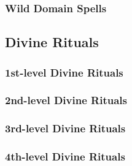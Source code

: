 \subsubsection{Wild Domain Spells}

\begin{spelllist}
    \SLentangle[1]
    \SLrockblast[2]
    \SLearthspull[3]
    \SLsunbeam[4]
    \SLavatarofgrowth[5]
    \SLlifegivingroots[6]
    \SLsunburst[7]
    \SLfirestorm[8]
    \SLearthquake[9]
\end{spelllist}

\subsection{Divine Rituals}\label{Divine Rituals}
\subsubsection{1st-level Divine Rituals}
\begin{rituallist}
    \SLblesswater
    \SLcreatewater
    \SLendureelements
    \SLidentify
    \SLlight
    \SLmending
    \SLpurifysustenance
    \SLreadmagic
\end{rituallist}

\subsubsection{2nd-level Divine Rituals}
\begin{rituallist}
    \SLaugury
    \SLcomprehendlanguages
    \SLcreatesustenance
    \SLdarkness
    \SLfindtraps
    \SLenhancearmor
    \SLenhanceweapon
    \SLgentlerepose
    \SLinvisibilitypurge
    \SLshaping
    \SLzoneoftruth
\end{rituallist}

\subsubsection{3rd-level Divine Rituals}
\begin{rituallist}
    \SLanimatedead
    \SLbinding
    \SLcontagion
    \SLitemattunement
    \SLrestoresenses
    \SLremovedisease
    \SLspeakwithdead
    \SLwaterbreathing
\end{rituallist}

\subsubsection{4th-level Divine Rituals}
\begin{rituallist}
    \SLdivination
    \SLremovecurse
    \SLsending
    \SLtongues
\end{rituallist}

